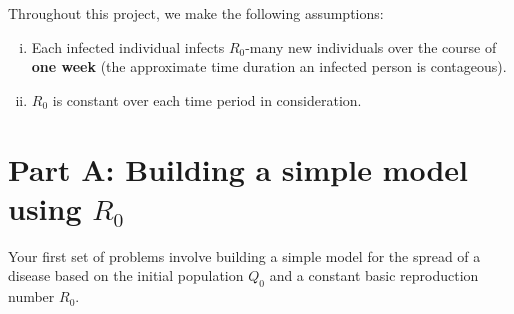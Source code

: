 \documentclass[11pt,reqno,final]{amsart}
\numberwithin{equation}{section}
\numberwithin{figure}{section}
\theoremstyle{definition} %
\begin{document}
Throughout this project, we make the following assumptions:
\begin{enumerate}[(i)]
\item Each infected individual infects $R_0$-many new individuals over the course of \textbf{one week} (the approximate time duration an infected person is contageous).
\item $R_0$ is constant over each time period in consideration.
\end{enumerate}

\newpage

\section*{Part A: Building a simple model using $R_0$}

Your first set of problems involve building a simple model for the spread of a disease based on
the initial population $Q_0$ and a constant basic reproduction number $R_0$.
\end{document}
